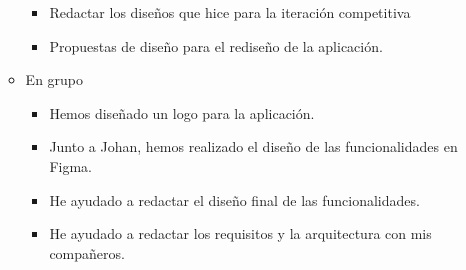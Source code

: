 \begin{itemize}
\begin{itemize}
\begin{itemize}
                        \item Redactar los diseños que hice para la iteración competitiva
                        \item Propuestas de diseño para el rediseño de la aplicación.
                    \end{itemize}
              \item En grupo
                    \begin{itemize}
                        \item Hemos diseñado un logo para la aplicación.
                        \item Junto a Johan, hemos realizado el diseño de las funcionalidades en Figma.
                        \item He ayudado a redactar el diseño final de las funcionalidades.
                        \item He ayudado a redactar los requisitos y la arquitectura con mis compañeros.
                    \end{itemize}
          \end{itemize}
\end{itemize}

